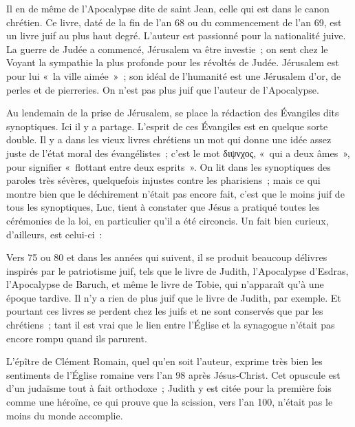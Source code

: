 \documentclass[french,twoside]{book} %
\newcommand\orgName[1]{#1}
\newcommand\persName[1]{#1}
\newcommand\placeName[1]{#1}
\begin{document}
Il en de même de l’Apocalypse dite de {\persName saint Jean}, celle qui est dans le canon chrétien. Ce livre, daté de la fin de l’an 68 ou du commencement de l’an 69, est un livre juif au plus haut degré. L’auteur est passionné pour la nationalité juive. La guerre de {\placeName Judée} a commencé, {\placeName Jérusalem} va être investie ; on sent chez le {\persName Voyant} la sympathie la plus profonde pour les révoltés de {\placeName Judée}. {\placeName Jérusalem} est pour lui « la ville aimée » ; son idéal de l’humanité est une Jérusalem d’or, de perles et de pierreries. On n’est pas plus juif que l’auteur de l’Apocalypse.\par
Au lendemain de la prise de {\placeName Jérusalem}, se place la rédaction des Évangiles dits synoptiques. Ici il y a partage. L’esprit de ces Évangiles est en quelque sorte double. Il y a dans les vieux livres chrétiens un mot qui donne une idée assez juste de l’état moral des évangélistes ; c’est le mot διψνχος, « qui a deux âmes », pour signifier « flottant entre deux esprits ». On lit dans les synoptiques des paroles très sévères, quelquefois injustes contre les pharisiens ; mais ce qui montre bien que le déchirement n’était pas encore fait, c’est que le moins juif de tous les synoptiques, Luc, tient à constater que {\persName Jésus} a pratiqué toutes les cérémonies de la loi, en particulier qu’il a été circoncis. Un fait bien curieux, d’ailleurs, est celui-ci :\par
Vers 75 ou 80 et dans les années qui suivent, il se produit beaucoup délivres inspirés par le patriotisme juif, tels que le livre de {\persName Judith}, l’Apocalypse d’{\persName Esdras}, l’Apocalypse de {\persName Baruch}, et même le livre de {\persName Tobie}, qui n’apparaît qu’à une époque tardive. Il n’y a rien de plus juif que le livre de {\persName Judith}, par exemple. Et pourtant ces livres se perdent chez les {\orgName juifs} et ne sont conservés que par les {\orgName chrétiens} ; tant il est vrai que le lien entre l’{\orgName Église} et la {\orgName synagogue} n’était pas encore rompu quand ils parurent.\par
L’épître de {\persName Clément Romain}, quel qu’en soit l’auteur, exprime très bien les sentiments de l’{\orgName Église romaine} vers l’an 98 après Jésus-Christ. Cet opuscule est d’un judaïsme tout à fait orthodoxe ; {\persName Judith} y est citée pour la première fois comme une héroïne, ce qui prouve que la scission, vers l’an 100, n’était pas le moins du monde accomplie.\par
\end{document}
